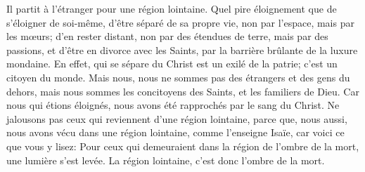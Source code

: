 Il partit à l’étranger pour une région lointaine.
	Quel pire éloignement que de s’éloigner de soi-même,
	d’être séparé de sa propre vie, non par l’espace, mais par les mœurs;
	d’en rester distant, non par des étendues de terre, mais par des passions,
	et d’être en divorce avec les Saints,
		par la barrière brûlante de la luxure mondaine.
En effet, qui se sépare du Christ est un exilé de la patrie;
	c’est un citoyen du monde.
Mais nous, nous ne sommes pas des étrangers et des gens du dehors,
	mais nous sommes les concitoyens des Saints, et les familiers de Dieu.
Car nous qui étions éloignés,
	nous avons été rapprochés par le sang du Christ.
Ne jalousons pas ceux qui reviennent d’une région lointaine,
	parce que, nous aussi, nous avons vécu dans une région lointaine,
	comme l’enseigne Isaïe, car voici ce que vous y lisez:
	Pour ceux qui demeuraient dans la région de l’ombre de la mort,
		une lumière s’est levée.
La région lointaine, c’est donc l’ombre de la mort.
